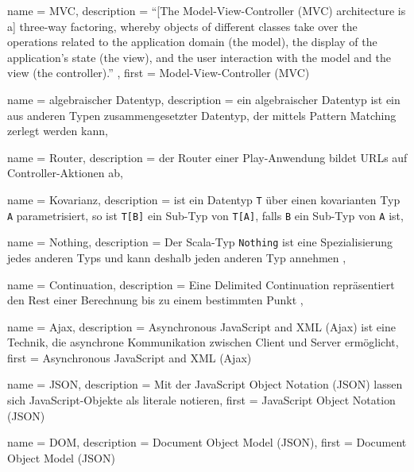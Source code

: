 






{
  name        = MVC,
  description = {"`[The Model-View-Controller (MVC) architecture is a] three-way factoring, whereby objects of different classes take over the operations related to the application domain (the model), the display of the application's state (the view), and the user interaction with the model and the view (the controller)."' \cite[vgl.][S.~1]{mvc}},
  first       = {Model-View-Controller (MVC)}
}


{
  name        = algebraischer Datentyp,
  description = {ein algebraischer Datentyp ist ein aus anderen Typen zusammengesetzter Datentyp, der mittels Pattern Matching zerlegt werden kann},
}


{
  name        = Router,
  description = {der Router einer Play-Anwendung bildet URLs auf Controller-Aktionen ab},
}


{
  name        = Kovarianz,
  description = {ist ein Datentyp \lstinline|T| über einen kovarianten Typ \lstinline|A| parametrisiert, so ist \lstinline|T[B]| ein Sub-Typ von \lstinline|T[A]|, falls \lstinline|B| ein Sub-Typ von \lstinline|A| ist},
}


{
  name        = Nothing,
  description = {Der Scala-Typ \lstinline|Nothing| ist eine Spezialisierung jedes anderen Typs und kann deshalb jeden anderen Typ annehmen \cite[vgl.][S.~256--257]{programming_in_scala}},
}


{
  name        = Continuation,
  description = {Eine Delimited Continuation repräsentiert den Rest einer Berechnung bis zu einem bestimmten Punkt \cite[vgl.][S.~1]{continuations}},
}


{
  name        = Ajax,
  description = {Asynchronous JavaScript and XML (Ajax) ist eine Technik, die asynchrone Kommunikation zwischen Client und Server ermöglicht},
  first       = {Asynchronous JavaScript and XML (Ajax)}
}


{
  name        = JSON,
  description = {Mit der JavaScript Object Notation (JSON) lassen sich JavaScript-Objekte als literale notieren},
  first       = {JavaScript Object Notation (JSON)}
}


{
  name        = DOM,
  description = {Document Object Model (JSON)},
  first       = {Document Object Model (JSON)}
}